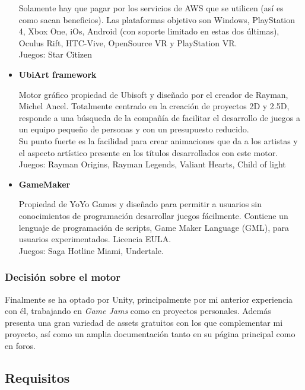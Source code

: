 \begin{itemize}
\quad Solamente hay que pagar por los servicios de AWS que se utilicen (así es como sacan beneficios). Las plataformas objetivo son Windows, PlayStation 4, Xbox One, iOs, Android (con soporte limitado en estas dos últimas), Oculus Rift, HTC-Vive, OpenSource VR y PlayStation VR.\\

\quad Juegos: Star Citizen\\

\item{\textbf{UbiArt framework}}

\quad Motor gráfico propiedad de Ubisoft y diseñado por el creador de Rayman, Michel Ancel. Totalmente centrado en la creación de proyectos 2D y 2.5D, responde a una
búsqueda de la compañía de facilitar el desarrollo de juegos a un equipo pequeño de personas y con un presupuesto reducido.\\

\quad Su punto fuerte es la facilidad para crear animaciones que da a los artistas y el aspecto artístico presente en los títulos desarrollados con este motor.\\

\quad Juegos: Rayman Origins, Rayman Legends, Valiant Hearts, Child of light \\

\item{\textbf{GameMaker}}

\quad Propiedad de YoYo Games y diseñado para permitir a usuarios sin conocimientos de programación desarrollar juegos fácilmente. Contiene un lenguaje de programación de scripts, Game Maker Language (GML), para usuarios experimentados. Licencia EULA.\\

\quad Juegos: Saga Hotline Miami, Undertale.\\
\end{itemize}

\subsubsection{Decisión sobre el motor}
\quad Finalmente se ha optado por Unity, principalmente por mi anterior experiencia con él, trabajando en \textit{Game Jams} como en proyectos personales. Además presenta una gran variedad de assets gratuitos con los que complementar mi proyecto, así como un amplia documentación tanto en su página principal como en foros.

\subsection{Requisitos}
